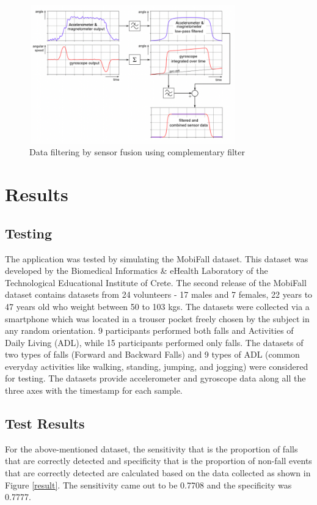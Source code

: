 \documentclass[conference]{IEEEtran}
\begin{document}
\begin{figure}
\centerline{\includegraphics[width=9cm, height=6cm]{sensorFusion.png}}
\caption{Data filtering by sensor fusion using complementary filter  \cite{b11}}
\label{sensorFusion}
\end{figure}


\section{Results}
\subsection{Testing}
The application was tested by simulating the MobiFall dataset\cite{b12}. This dataset was developed by the Biomedical Informatics & eHealth Laboratory of the Technological Educational Institute of Crete. The second release of the MobiFall dataset contains datasets from 24 volunteers - 17 males and 7 females, 22 years to 47 years old who weight between 50 to 103 kgs. The datasets were collected via a smartphone which was located in a trouser pocket freely chosen by the subject in any random orientation. 9 participants performed both falls and Activities of Daily Living (ADL), while 15 participants performed only falls. The datasets of two types of falls (Forward and Backward Falls) and 9 types of ADL (common everyday activities like walking, standing, jumping, and jogging) were considered for testing. The datasets provide accelerometer and gyroscope data along all the three axes with the timestamp for each sample.
\subsection{Test Results}
For the above-mentioned dataset, the sensitivity that is the proportion of falls that are correctly detected and specificity that is the proportion of non-fall events that are correctly detected \cite{b14} are calculated based on the data collected as shown in Figure 
\ref{result}. The sensitivity came out to be 0.7708 and the specificity was 0.7777. 
\end{document}
